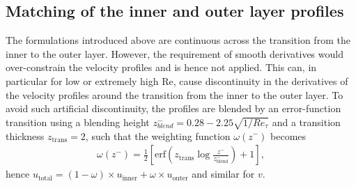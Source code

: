 \documentclass[smallcondensed,final]{svjour3}
\newcommand{\RE}{\mathrm{Re}}
\begin{document}
\subsection{Matching of the inner and outer layer profiles}
% 
The formulations introduced above are continuous across the transition from the inner to 
the outer layer. 
% 
However, the requirement of smooth derivatives would over-constrain the velocity profiles and is hence not applied. 
% 
This can, in particular for low or extremely high $\RE$, cause discontinuity in the derivatives of the velocity profiles around the transition from the inner to the outer layer. 
% 
To avoid such artificial discontinuity, the profiles are blended by an error-function transition using a blending 
height $z_{blend}^-=0.28-2.25\sqrt{1/Re_\tau}$ and a transition thickness 
$z_\text{trans}=2$, 
such that the weighting function $\omega(z^-)$ becomes 
\begin{align}
  \omega(z^-) = \frac12 \left[\text{erf}\left(z_\text{trans}\log\frac{z^-}{z_{\text{blend}}^{-}}\right) +1\right],
\end{align}
hence 
 $u_\text{total} = (1-\omega) \times u_\text{inner} + \omega \times u_\text{outer}$ and similar for $v$. 
\end{document}
